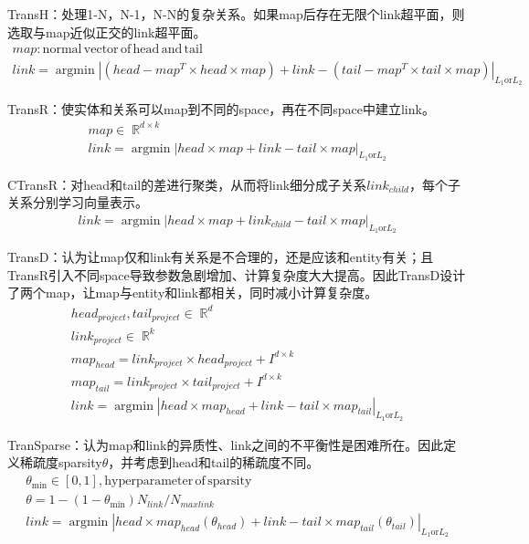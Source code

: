 \documentclass[12pt]{ctexart}
\DeclareMathOperator\argmin{argmin}
\DeclareMathOperator\R{\mathbb{R}}
\theoremstyle{definition}
\begin{document}
TransH：处理1-N，N-1，N-N的复杂关系。如果map后存在无限个link超平面，则选取与map近似正交的link超平面。
\[\begin{array}{l}
    map: \mathrm{normal\, vector\, of\, head\, and\, tail}\\
    link=\argmin |(head-map^T \times head \times map) + link - (tail-map^T \times tail \times map)|_{L_1 \mathrm{or} L_2}
\end{array}\]

TransR：使实体和关系可以map到不同的space，再在不同space中建立link。
\[\begin{array}{l}
    map\in \R^{d\times k}\\
    link=\argmin |head\times map + link - tail\times map|_{L_1\mathrm{or} L_2}
\end{array}\]

CTransR：对head和tail的差进行聚类，从而将link细分成子关系$link_{child}$，每个子关系分别学习向量表示。
\[\begin{array}{l}
    link=\argmin |head\times map + link_{child} - tail\times map|_{L_1\mathrm{or} L_2}
\end{array}\]

TransD：认为让map仅和link有关系是不合理的，还是应该和entity有关；且TransR引入不同space导致参数急剧增加、计算复杂度大大提高。因此TransD设计了两个map，让map与entity和link都相关，同时减小计算复杂度。
\[\begin{array}{l}
    head_{project}, tail_{project}\in \R^d\\
    link_{project}\in \R^k\\
    map_{head}=link_{project} \times head_{project} +I^{d\times k}\\
    map_{tail}=link_{project}\times tail_{project}+I^{d\times k}\\
    link=\argmin |head\times map_{head}+link-tail\times map_{tail}|_{L_1\mathrm{or} L_2}
\end{array}\]

TranSparse：认为map和link的异质性、link之间的不平衡性是困难所在。因此定义稀疏度sparsity$\theta$，并考虑到head和tail的稀疏度不同。
\[\begin{array}{l}
    \theta_{\min}\in[0,1],\mathrm{hyperparameter \,of \,sparsity}\\
    \theta=1-(1-\theta_{\min})N_{link}/N_{max link}\\
    link=\argmin |head\times map_{head}(\theta_{head}) + link - tail\times map_{tail}(\theta_{tail})|_{L_1\mathrm{or} L_2}
\end{array}\]
\end{document}

